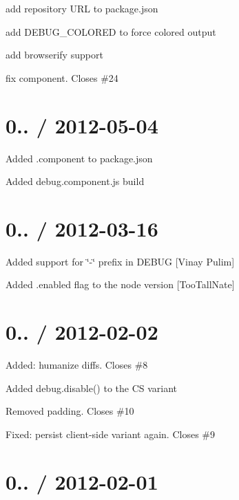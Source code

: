 \begin{DoxyItemize}
\item add repository U\+RL to package.\+json
\item add D\+E\+B\+U\+G\+\_\+\+C\+O\+L\+O\+R\+ED to force colored output
\item add browserify support
\item fix component. Closes \#24
\end{DoxyItemize}

\section*{0.. / 2012-\/05-\/04 }


\begin{DoxyItemize}
\item Added .component to package.\+json
\item Added debug.\+component.\+js build
\end{DoxyItemize}

\section*{0.. / 2012-\/03-\/16 }


\begin{DoxyItemize}
\item Added support for \char`\"{}-\/\char`\"{} prefix in D\+E\+B\+UG \mbox{[}Vinay Pulim\mbox{]}
\item Added {\ttfamily .enabled} flag to the node version \mbox{[}Too\+Tall\+Nate\mbox{]}
\end{DoxyItemize}

\section*{0.. / 2012-\/02-\/02 }


\begin{DoxyItemize}
\item Added\+: humanize diffs. Closes \#8
\item Added {\ttfamily debug.\+disable()} to the CS variant
\item Removed padding. Closes \#10
\item Fixed\+: persist client-\/side variant again. Closes \#9
\end{DoxyItemize}

\section*{0.. / 2012-\/02-\/01 }


